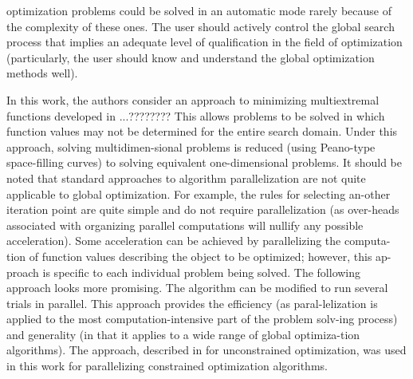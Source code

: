 \documentclass[runningheads]{llncs}
\begin{document}
optimization problems could be solved in an automatic mode rarely because of the
complexity of these ones. The user should actively control the global search
process that implies an adequate level of qualification in the field of optimization
(particularly, the user should know and understand the global optimization methods well).
\par
In this work, the authors consider an approach to minimizing multiextremal functions developed in ...????????
This allows problems to be solved in which function values may not be determined for the entire search domain. Under this approach, solving multidimen-sional problems is reduced (using Peano-type space-filling curves) to solving equivalent one-dimensional problems.
It should be noted that standard approaches to algorithm parallelization are not quite applicable to global optimization. For example, the rules for selecting an-other iteration point are quite simple and do not require parallelization (as over-heads associated with organizing parallel computations will nullify any possible acceleration). Some acceleration can be achieved by parallelizing the computa-tion of function values describing the object to be optimized; however, this ap-proach is specific to each individual problem being solved.
The following approach looks more promising. The algorithm can be modified to run several trials in parallel. This approach provides the efficiency (as paral-lelization is applied to the most computation-intensive part of the problem solv-ing process) and generality (in that it applies to a wide range of global optimiza-tion algorithms). The approach, described in  \cite{Two_Level_Parallel} for unconstrained optimization, was used in this work for parallelizing constrained optimization algorithms.
\end{document}
